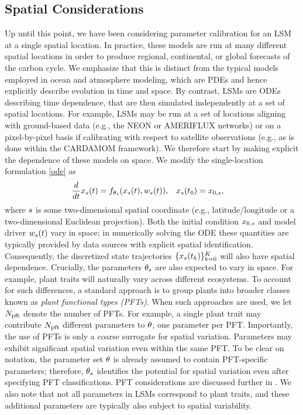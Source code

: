 \documentclass[12pt]{article}
\begin{document}
\subsection{Spatial Considerations}
Up until this point, we have been considering parameter calibration for an LSM at a single spatial location. In practice, these 
models are run at many different spatial locations in order to produce regional, continental, or global forecasts of the carbon 
cycle. We emphasize that this is distinct from the typical models employed in ocean and atmosphere modeling, which are PDEs
and hence explicitly describe evolution in time and space. By contrast, LSMs are ODEs describing time dependence, that 
are then simulated independently at a set of spatial locations. For example, LSMs may be run at a set of locations 
aligning with ground-based data (e.g., the NEON or AMERIFLUX networks) or on a pixel-by-pixel basis if calibrating with 
respect to satellite observations (e.g., as is done within the CARDAMOM framework). We therefore start by making explicit 
the dependence of these models on space. We modify the single-location formulation \ref{ode} as
\begin{align}
&\frac{d}{dt} {x}_{s}(t) = f_{{\theta}_{s}}({x}_{s}(t), {w}_{s}(t)), &&{x}_{s}({t}_{0}) = x_{0,s}, \label{ode-space}
\end{align}
where $s$ is some two-dimensional spatial coordinate (e.g., latitude/longitude or a two-dimensional Euclidean projection). Both the 
initial condition $x_{0,s}$ and model driver ${w}_{s}(t)$ vary in space; in numerically solving 
the ODE these quantities are typically provided by data sources with explicit spatial identification. Consequently, the discretized state trajectories 
$\{{x}_{s}({t}_{k})\}_{k=0}^{K}$ will also have spatial dependence. Crucially, 
the parameters ${\theta}_{s}$ are also expected to vary in space. For example, plant traits will naturally vary across different ecosystems. 
To account for such differences, a standard approach is to group plants into broader classes known as \textit{plant functional types (PFTs)}. 
When such approaches are used, we let $N_{\textrm{pft}}$ denote the number of PFTs. 
For example, a single plant trait may contribute $N_{\textrm{pft}}$ different parameters to $\theta$, one parameter per PFT. Importantly, the use of PFTs is 
only a coarse surrogate for spatial variation. Parameters may exhibit significant spatial variation even within the same PFT. To be clear on notation, 
the parameter set $\theta$ is already assumed to contain PFT-specific parameters; therefore, ${\theta}_{s}$ identifies the potential for 
spatial variation even after specifying PFT classifications. PFT considerations are discussed further in 
. We also note that not all parameters in LSMs correspond to plant traits, and these 
additional parameters are typically also subject to spatial variability. 
\end{document}
